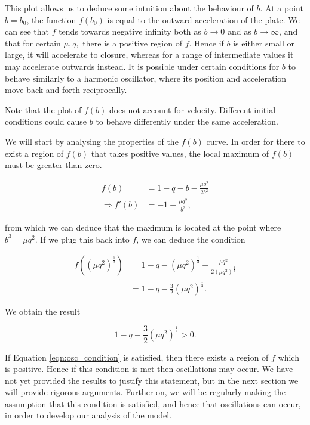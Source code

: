 \documentclass{article}
\begin{document}
This plot allows us to deduce some intuition about the behaviour of $b$.
At a point $b=b_0$, the function $f(b_0)$ is equal to the outward acceleration of the plate.
We can see that $f$ tends towards negative infinity both as $b\rightarrow 0$ and as $b\rightarrow\infty$,
and that for certain $\mu, q,$ there is a positive region of $f$.
Hence if $b$ is either small or large, it will accelerate to closure,
whereas for a range of intermediate values it may accelerate outwards instead.
It is possible under certain conditions for $b$ to behave similarly to a harmonic oscillator,
where its position and acceleration move back and forth reciprocally.

Note that the plot of $f(b)$ does not account for velocity.
Different initial conditions could cause $b$ to behave differently under the same acceleration.

We will start by analysing the properties of the $f(b)$ curve.
In order for there to exist a region of $f(b)$ that takes positive values,
the local maximum of $f(b)$ must be greater than zero.

\begin{align}
    f(b)              & = 1 - q - b - \frac{\mu q^2}{2b^2} \\
    \Rightarrow f'(b) & = -1 + \frac{\mu q^2}{b^3},
\end{align}

from which we can deduce that the maximum is located at the point where $b^3 = \mu q^2$.
If we plug this back into $f$, we can deduce the condition

\begin{align}
    f((\mu q^2)^{\frac{1}{3}}) & = 1 - q - (\mu q^2)^{\frac{1}{3}} - \frac{\mu q^2}{2(\mu q^2)^{\frac{2}{3}}} \\
                               & = 1 - q - \frac{3}{2}(\mu q^2)^{\frac{1}{3}}.
\end{align}

We obtain the result

\begin{equation}
    1 - q - \frac{3}{2}(\mu q^2)^{\frac{1}{3}} > 0.
    \label{eqn:osc_condition}
\end{equation}

If Equation \ref{eqn:osc_condition} is satisfied,
then there exists a region of $f$ which is positive.
Hence if this condition is met then oscillations may occur. %
We have not yet provided the results to justify this statement, but in the next section we will provide rigorous arguments. %
Further on, we will be regularly making the assumption that this condition is satisfied,
and hence that oscillations can occur,
in order to develop our analysis of the model.
\end{document}
